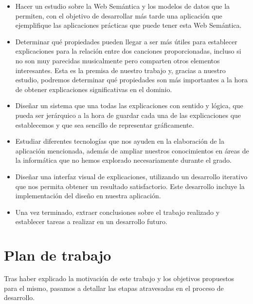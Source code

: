 \begin{itemize}
\item Hacer un estudio sobre la Web Semántica y los modelos de datos que la permiten, con el objetivo de desarrollar más tarde una aplicación que ejemplifique las aplicaciones prácticas que puede tener esta Web Semántica.\\

\item Determinar qué propiedades pueden llegar a ser más útiles para establecer explicaciones para la relación entre dos canciones proporcionadas, incluso si no son muy parecidas musicalmente pero comparten otros elementos interesantes. Esta es la premisa de nuestro trabajo y, gracias a nuestro estudio, podremos determinar qué propiedades son más importantes a la hora de obtener explicaciones significativas en el dominio.\\

\item Diseñar un sistema que una todas las explicaciones con sentido y lógica, que pueda ser jerárquico a la hora de guardar cada una de las explicaciones que establecemos y que sea sencillo de representar gráficamente.\\

\item Estudiar diferentes tecnologías que nos ayuden en la elaboración de la aplicación mencionada, además de ampliar nuestros conocimientos en áreas de la informática que no hemos explorado necesariamente durante el grado.\\

\item Diseñar una interfaz visual de explicaciones, utilizando un desarrollo iterativo que nos permita obtener un resultado satisfactorio. Este desarrollo incluye la implementación del diseño en nuestra aplicación.\\

\item Una vez terminado, extraer conclusiones sobre el trabajo realizado y establecer tareas a realizar en un desarrollo futuro.\\
\end{itemize}


\section{Plan de trabajo}

Tras haber explicado la motivación de este trabajo y los objetivos propuestos para el mismo, pasamos a detallar las etapas atravesadas en el proceso de desarrollo.\\

